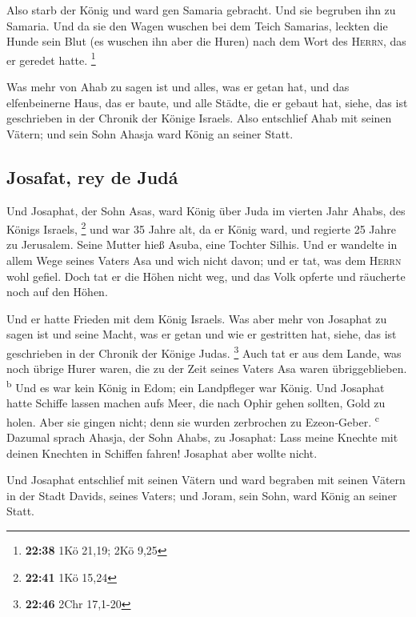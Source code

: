  Also starb der König und ward gen Samaria gebracht. Und
sie begruben ihn zu Samaria.  Und da sie den Wagen
wuschen bei dem Teich Samarias, leckten die Hunde sein Blut (es wuschen
ihn aber die Huren) nach dem Wort des \textsc{Herrn}, das er geredet
hatte. \footnote{\textbf{22:38} 1Kö 21,19; 2Kö 9,25}

 Was mehr von Ahab zu sagen ist und alles, was er getan
hat, und das elfenbeinerne Haus, das er baute, und alle Städte, die er
gebaut hat, siehe, das ist geschrieben in der Chronik der Könige
Israels.  Also entschlief Ahab mit seinen Vätern; und
sein Sohn Ahasja ward König an seiner Statt.

\hypertarget{josafat-rey-de-juduxe1}{%
\subsection{Josafat, rey de Judá}\label{josafat-rey-de-juduxe1}}

 Und Josaphat, der Sohn Asas, ward König über Juda im
vierten Jahr Ahabs, des Königs Israels, \footnote{\textbf{22:41} 1Kö
  15,24}  und war 35 Jahre alt, da er König ward, und
regierte 25 Jahre zu Jerusalem. Seine Mutter hieß Asuba, eine Tochter
Silhis.  Und er wandelte in allem Wege seines Vaters Asa
und wich nicht davon; und er tat, was dem \textsc{Herrn} wohl gefiel.
 Doch tat er die Höhen nicht weg, und das Volk opferte
und räucherte noch auf den Höhen.

 Und er hatte Frieden mit dem König Israels.
 Was aber mehr von Josaphat zu sagen ist und seine Macht,
was er getan und wie er gestritten hat, siehe, das ist geschrieben in
der Chronik der Könige Judas. \footnote{\textbf{22:46} 2Chr 17,1-20}
 Auch tat er aus dem Lande, was noch übrige Hurer waren,
die zu der Zeit seines Vaters Asa waren übriggeblieben.
\textsuperscript{b}  Und es war kein König in Edom; ein
Landpfleger war König.  Und Josaphat hatte Schiffe lassen
machen aufs Meer, die nach Ophir gehen sollten, Gold zu holen. Aber sie
gingen nicht; denn sie wurden zerbrochen zu Ezeon-Geber.
\textsuperscript{c}  Dazumal sprach Ahasja, der Sohn
Ahabs, zu Josaphat: Lass meine Knechte mit deinen Knechten in Schiffen
fahren! Josaphat aber wollte nicht.

 Und Josaphat entschlief mit seinen Vätern und ward
begraben mit seinen Vätern in der Stadt Davids, seines Vaters; und
Joram, sein Sohn, ward König an seiner Statt.

